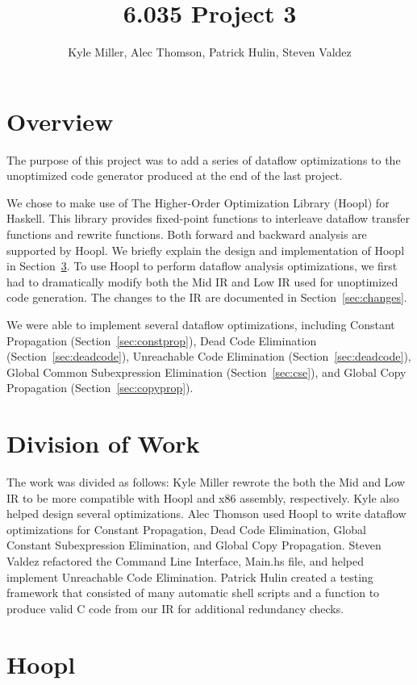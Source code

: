 \documentclass[11pt]{article}
\title{6.035 Project 3}
\author{Kyle Miller, Alec Thomson, Patrick Hulin, Steven Valdez}
\begin{document}
 
\maketitle


\section {Overview} 

The purpose of this project was to add a series of dataflow optimizations to the unoptimized code generator produced at the end of the last project. 

We chose to make use of The Higher-Order Optimization Library (Hoopl) for Haskell. This library provides fixed-point functions to interleave dataflow transfer functions and rewrite functions. Both forward and backward analysis are supported by Hoopl. We briefly explain the design and implementation of Hoopl in Section~\ref{sec:hoopl}. To use Hoopl to perform dataflow analysis optimizations, we first had to dramatically modify both the Mid IR and Low IR used for unoptimized code generation. The changes to the IR are documented in Section~\ref{sec:changes}. 

We were able to implement several dataflow optimizations, including Constant Propagation (Section~\ref{sec:constprop}), Dead Code Elimination (Section~\ref{sec:deadcode}), Unreachable Code Elimination (Section~\ref{sec:deadcode}), Global Common Subexpression Elimination (Section~\ref{sec:cse}), and Global Copy Propagation (Section~\ref{sec:copyprop}). 
\section {Division of Work} 
\label{sec:division} 

The work was divided as follows: Kyle Miller rewrote the both the Mid and Low IR to be more compatible with Hoopl and x86 assembly, respectively. Kyle also helped design several optimizations. Alec Thomson used Hoopl to write dataflow optimizations for Constant Propagation, Dead Code Elimination, Global Constant Subexpression Elimination, and Global Copy Propagation. Steven Valdez refactored the Command Line Interface, Main.hs file, and helped implement Unreachable Code Elimination. Patrick Hulin created a testing framework that consisted of many automatic shell scripts and a function to produce valid C code from our IR for additional redundancy checks. 

\section {Hoopl}
\label{sec:hoopl} 
\end{document}
